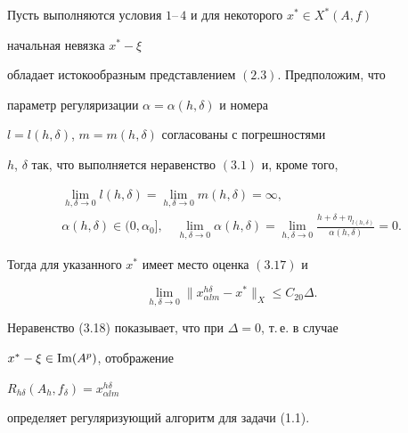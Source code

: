 \begin{thmnonum}


Пусть выполняются условия $1$--\,$4$ и для некоторого $x^* \in X^*(A,f)$


начальная невязка $x^{*}- \xi$


обладает истокообразным представлением $(2.3)$. Предположим, что


параметр регуляризации $\alpha= \alpha(h, \delta)$ и номера


$l=l(h, \delta)$, $m=m(h, \delta)$ согласованы с погрешностями


$h$, $\delta$ так, что выполняется неравенство $(3.1)$ и, кроме того,


\begin{gather*}


\lim \limits_{h, \delta \to 0} l(h, \delta)=


\lim \limits_{h, \delta \to 0} m(h, \delta)=\infty, \\


\alpha(h, \delta) \in (0, \alpha_0],


\quad \lim \limits_{h, \delta \to 0}


\alpha(h, \delta)=


\lim \limits_{h, \delta \to 0 } \frac{h+ \delta + \eta_{l(h, \delta)}}


{\alpha(h, \delta)}=0.


\end{gather*}


Тогда для указанного $x^*$ имеет место оценка $(3.17)$ и


\begin{equation}


\lim \limits_{h, \delta \to 0}


\| x^{h \delta}_{\alpha l m} - x^{*} \|_X


\leq C_{20} \Delta.


\tag {3.18}


\end{equation}


\end{thmnonum}





Неравенство (3.18) показывает, что при $\Delta =0$, т.\,е. в случае


$x^* - \xi \in \operatorname{Im}(A^p)$, отображение


$R_{h \delta}(A_h, f_{\delta})=x^{h \delta}_{\alpha l m}$


определяет регуляризующий алгоритм для задачи (1.1).


